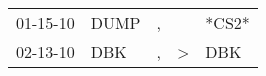 \begin{supertabular}{p{0.07\textwidth}p{0.06\textwidth}p{0.02\textwidth}p{0.02\textwidth}p{0.06\textwidth}}
 01-15-10\textsuperscript{} &  DUMP\textsuperscript{} &  , &               &                  *CS2* \\
 02-13-10\textsuperscript{} &   DBK\textsuperscript{} &  , &  \textgreater &  DBK\textsuperscript{} \\
\end{supertabular}
